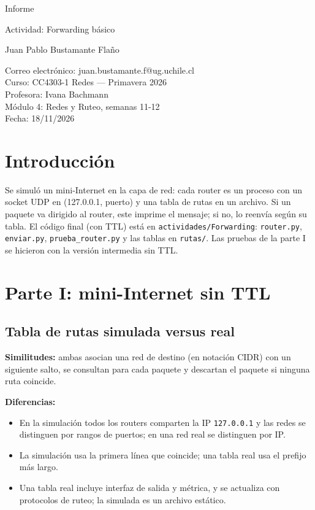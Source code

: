 \documentclass[11pt,letterpaper]{article}
\newcommand{\curso}{CC4303-1 Redes}
\newcommand{\tituloinforme}{Actividad: Forwarding básico}
\begin{document}
\begin{titlepage}
  \thispagestyle{portada}
  \centering
  \vspace*{5cm}
  {\LARGE Informe\par}
  \vspace{0.3cm}
  {\Large \tituloinforme\par}
  \vspace{0.4cm}
  {\large Juan Pablo Bustamante Flaño\par}
  \vfill
  Correo electrónico: juan.bustamante.f@ug.uchile.cl\\
  Curso: \curso{} --- Primavera 2026\\
  Profesora: Ivana Bachmann\\
  Módulo 4: Redes y Ruteo, semanas 11-12\\
  Fecha: 18/11/2026
  \vspace*{3cm}
\end{titlepage}

\section{Introducción}

Se simuló un mini-Internet en la capa de red: cada router es un proceso con un socket UDP
en (127.0.0.1, puerto) y una tabla de rutas en un archivo. Si un paquete va dirigido al
router, este imprime el mensaje; si no, lo reenvía según su tabla. El código final (con
TTL) está en \texttt{actividades/Forwarding}: \texttt{router.py}, \texttt{enviar.py},
\texttt{prueba\_router.py} y las tablas en \texttt{rutas/}. Las pruebas de la parte I se
hicieron con la versión intermedia sin TTL.

\section{Parte I: mini-Internet sin TTL}

\subsection{Tabla de rutas simulada versus real}

\textbf{Similitudes:} ambas asocian una red de destino (en notación CIDR) con un siguiente
salto, se consultan para cada paquete y descartan el paquete si ninguna ruta coincide.

\textbf{Diferencias:}
\begin{itemize}[nosep]
  \item En la simulación todos los routers comparten la IP \texttt{127.0.0.1} y las redes
        se distinguen por rangos de puertos; en una red real se distinguen por IP.
  \item La simulación usa la primera línea que coincide; una tabla real usa el prefijo
        más largo.
  \item Una tabla real incluye interfaz de salida y métrica, y se actualiza con protocolos
        de ruteo; la simulada es un archivo estático.
\end{itemize}
\end{document}
